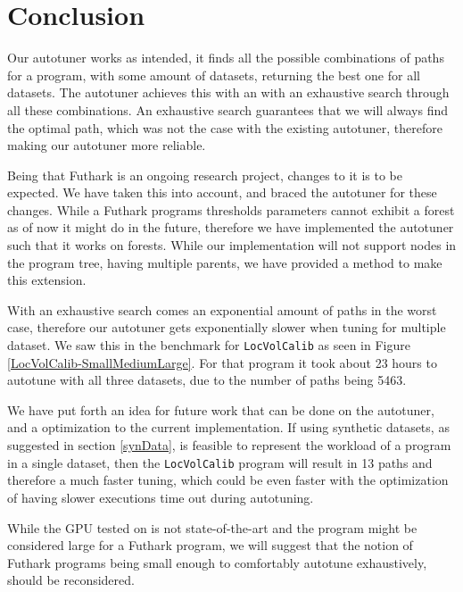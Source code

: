 \section{Conclusion}
\label{conclusion}
Our autotuner works as intended, it finds all the possible combinations of paths for a program, with some amount of datasets, returning the best one for all datasets. The autotuner achieves this with an with an exhaustive search through all these combinations. An exhaustive search guarantees that we will always find the optimal path, which was not the case with the existing autotuner, therefore making our autotuner more reliable.

Being that Futhark is an ongoing research project, changes to it is to be expected. We have taken this into account, and braced the autotuner for these changes. While a Futhark programs thresholds parameters cannot exhibit a forest as of now it might do in the future, therefore we have implemented the autotuner such that it works on forests. While our implementation will not support nodes in the program tree, having multiple parents, we have provided a method to make this extension.

With an exhaustive search comes an exponential amount of paths in the worst case, therefore our autotuner gets exponentially slower when tuning for multiple dataset. We saw this in the benchmark for \texttt{LocVolCalib} as seen in Figure \ref{LocVolCalib-SmallMediumLarge}. For that program it took about 23 hours to autotune with all three datasets, due to the number of paths being 5463. 

We have put forth an idea for future work that can be done on the autotuner, and a optimization to the current implementation. If using synthetic datasets, as suggested in section \ref{synData}, is feasible to represent the workload of a program in a single dataset, then the \texttt{LocVolCalib} program will result in 13 paths and therefore a much faster tuning, which could be even faster with the optimization of having slower executions time out during autotuning.

While the GPU tested on is not state-of-the-art and the program might be considered large for a Futhark program, we will suggest that the notion of Futhark programs being small enough to comfortably autotune exhaustively, should be reconsidered. 
